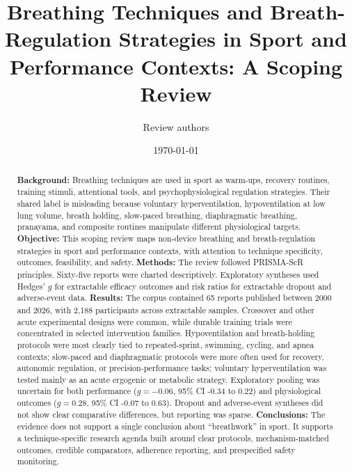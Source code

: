 \documentclass[12pt,a4paper]{article}
\title{\textbf{Breathing Techniques and Breath-Regulation Strategies in Sport and Performance Contexts: A Scoping Review}}
\author{Review authors}
\date{\today}
\begin{document}
\maketitle

\begin{abstract}
\textbf{Background:} Breathing techniques are used in sport as warm-ups, recovery routines, training stimuli, attentional tools, and psychophysiological regulation strategies. Their shared label is misleading because voluntary hyperventilation, hypoventilation at low lung volume, breath holding, slow-paced breathing, diaphragmatic breathing, pranayama, and composite routines manipulate different physiological targets. \textbf{Objective:} This scoping review maps non-device breathing and breath-regulation strategies in sport and performance contexts, with attention to technique specificity, outcomes, feasibility, and safety. \textbf{Methods:} The review followed PRISMA-ScR principles. Sixty-five reports were charted descriptively. Exploratory syntheses used Hedges' $g$ for extractable efficacy outcomes and risk ratios for extractable dropout and adverse-event data. \textbf{Results:} The corpus contained 65 reports published between 2000 and 2026, with 2,188 participants across extractable samples. Crossover and other acute experimental designs were common, while durable training trials were concentrated in selected intervention families. Hypoventilation and breath-holding protocols were most clearly tied to repeated-sprint, swimming, cycling, and apnea contexts; slow-paced and diaphragmatic protocols were more often used for recovery, autonomic regulation, or precision-performance tasks; voluntary hyperventilation was tested mainly as an acute ergogenic or metabolic strategy. Exploratory pooling was uncertain for both performance ($g=-0.06$, 95\% CI -0.34 to 0.22) and physiological outcomes ($g=0.28$, 95\% CI -0.07 to 0.63). Dropout and adverse-event syntheses did not show clear comparative differences, but reporting was sparse. \textbf{Conclusions:} The evidence does not support a single conclusion about ``breathwork'' in sport. It supports a technique-specific research agenda built around clear protocols, mechanism-matched outcomes, credible comparators, adherence reporting, and prespecified safety monitoring.
\end{abstract}
\end{document}
